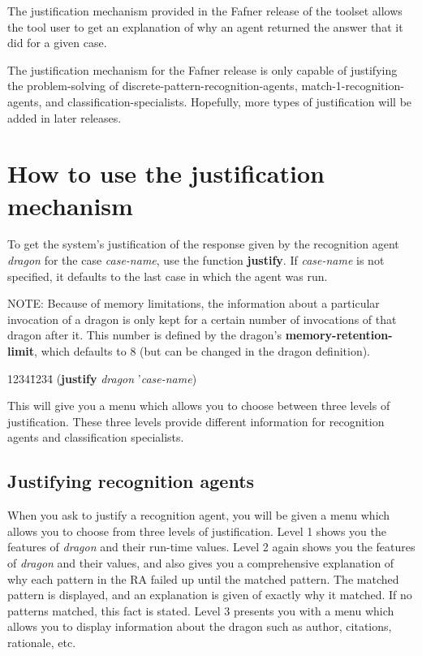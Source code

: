 The justification mechanism provided in the Fafner release of the
toolset allows the tool user to get an explanation of why an agent
returned the answer that it did for a given case.

The justification mechanism for the Fafner release is only capable of
justifying the problem-solving of discrete-pattern-recognition-agents,
match-1-recognition-agents, and classification-specialists.
Hopefully, more types of justification will be added in later
releases.

\section{How to use the justification mechanism}

To get the system's justification of the response given by the
recognition agent {\it dragon} for the case {\it case-name}, use the
function {\bf justify}. If {\it case-name} is not specified, it defaults
to the last case in which the agent was run.

NOTE: Because of memory limitations, the information about a
particular invocation of a dragon is only kept for a certain number of
invocations of that dragon after it. This number is defined by the
dragon's {\bf memory-retention-limit}, which defaults to 8 (but can be
changed in the dragon definition).

\begin{tabbing}
1234\=1234\= \kill
({\bf justify} {\it dragon} '{\it case-name})\\
\end{tabbing}
This will give you a menu which allows you to choose between three
levels of justification. These three levels provide different
information for recognition agents and classification specialists.

\subsection{Justifying recognition agents}
When you ask to justify a recognition agent, you will be given a menu
which allows you to choose from three levels of justification.  Level
1 shows you the features of {\it dragon} and their run-time values.
Level 2 again shows you the features of {\it dragon} and their values,
and also gives you a comprehensive explanation of why each pattern in
the RA failed up until the matched pattern. The matched pattern is
displayed, and an explanation is given of exactly why it matched. If
no patterns matched, this fact is stated. Level 3 presents you with a
menu which allows you to display information about the dragon such as
author, citations, rationale, etc.


